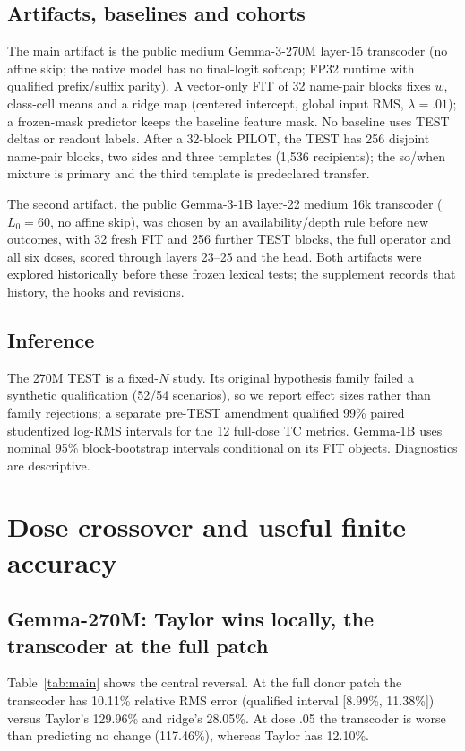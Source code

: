 \documentclass[11pt]{article}
\begin{document}
\subsection{Artifacts, baselines and cohorts}
The main artifact is the public medium Gemma-3-270M layer-15 transcoder (no affine skip; the native model has no final-logit softcap; FP32 runtime with qualified prefix/suffix parity). A vector-only FIT of 32 name-pair blocks fixes $w$, class-cell means and a ridge map (centered intercept, global input RMS, $\lambda=.01$); a frozen-mask predictor keeps the baseline feature mask. No baseline uses TEST deltas or readout labels. After a 32-block PILOT, the TEST has 256 disjoint name-pair blocks, two sides and three templates (1,536 recipients); the so/when mixture is primary and the third template is predeclared transfer.

The second artifact, the public Gemma-3-1B layer-22 medium 16k transcoder ($L_0=60$, no affine skip), was chosen by an availability/depth rule before new outcomes, with 32 fresh FIT and 256 further TEST blocks, the full operator and all six doses, scored through layers 23--25 and the head. Both artifacts were explored historically before these frozen lexical tests; the supplement records that history, the hooks and revisions.

\subsection{Inference}
The 270M TEST is a fixed-$N$ study. Its original hypothesis family failed a synthetic qualification (52/54 scenarios), so we report effect sizes rather than family rejections; a separate pre-TEST amendment qualified 99\% paired studentized log-RMS intervals for the 12 full-dose TC metrics. Gemma-1B uses nominal 95\% block-bootstrap intervals conditional on its FIT objects. Diagnostics are descriptive.

\section{Dose crossover and useful finite accuracy}
\subsection{Gemma-270M: Taylor wins locally, the transcoder at the full patch}
Table~\ref{tab:main} shows the central reversal. At the full donor patch the transcoder has 10.11\% relative RMS error (qualified interval [8.99\%, 11.38\%]) versus Taylor's 129.96\% and ridge's 28.05\%. At dose .05 the transcoder is worse than predicting no change (117.46\%), whereas Taylor has 12.10\%.
\end{document}
